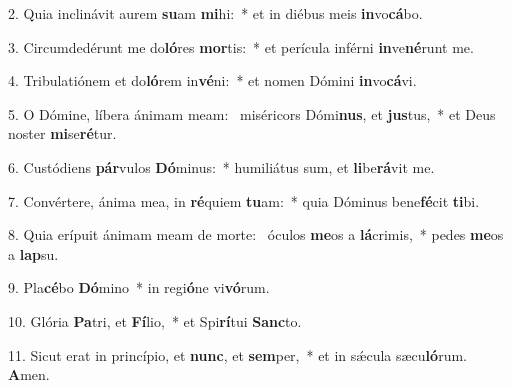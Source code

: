 2. Quia inclinávit aurem \textbf{su}am \textbf{mi}hi:~*  et in diébus meis \textbf{in}vo\textbf{cá}bo.\

3. Circumdedérunt me do\textbf{ló}res \textbf{mor}tis:~*  et perícula inférni \textbf{in}ve\textbf{né}runt me.\

4. Tribulatiónem et do\textbf{ló}rem in\textbf{vé}ni:~*  et nomen Dómini \textbf{in}vo\textbf{cá}vi.\

5. O Dómine, líbera ánimam meam: \dag\  miséricors Dómi\textbf{nus}, et \textbf{jus}tus,~*  et Deus noster \textbf{mi}se\textbf{ré}tur.\

6. Custódiens \textbf{pár}vulos \textbf{Dó}minus:~*  humiliátus sum, et \textbf{li}be\textbf{rá}vit me.\

7. Convértere, ánima mea, in \textbf{ré}quiem \textbf{tu}am:~*  quia Dóminus bene\textbf{fé}cit \textbf{ti}bi.\

8. Quia erípuit ánimam meam de morte: \dag\  óculos \textbf{me}os a \textbf{lá}crimis,~*  pedes \textbf{me}os a \textbf{lap}su.\

9. Pla\textbf{cé}bo \textbf{Dó}mino~*  in regi\textbf{ó}ne vi\textbf{vó}rum.\

10. Glória \textbf{Pa}tri, et \textbf{Fí}lio,~*  et Spi\textbf{rí}tui \textbf{Sanc}to.\

11. Sicut erat in princípio, et \textbf{nunc}, et \textbf{sem}per,~*  et in sǽcula sæcu\textbf{ló}rum. \textbf{A}men.\

